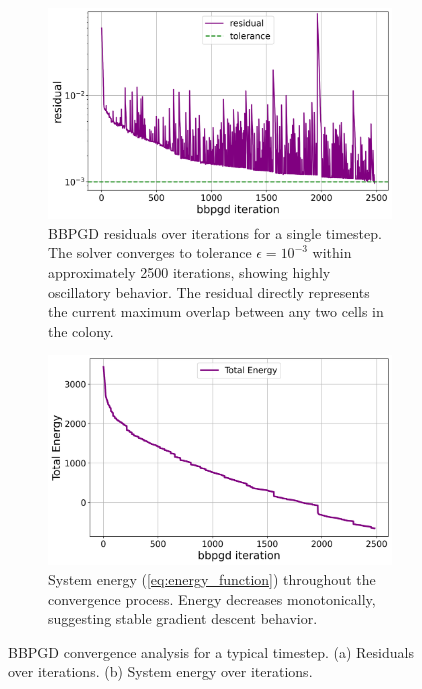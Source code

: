 \documentclass[conference]{IEEEtran}
\begin{document}
\begin{figure}[H]
    \centering
    \begin{subfigure}[b]{\linewidth}
        \centering
        \includegraphics[width=\linewidth]{figures/comparison_plots/bbpgd_residual.png}
        \caption{BBPGD residuals over iterations for a single timestep. The solver converges to tolerance $\epsilon = 10^{-3}$ within approximately 2500 iterations, showing highly oscillatory behavior. The residual directly represents the current maximum overlap between any two cells in the colony.}
        \label{fig:bbpgd_residual}
    \end{subfigure}

    \begin{subfigure}[b]{\linewidth}
        \centering
        \includegraphics[width=\linewidth]{figures/comparison_plots/bbpgd_total_energy.png}
        \caption{System energy (\autoref{eq:energy_function}) throughout the convergence process. Energy decreases monotonically, suggesting stable gradient descent behavior.}
        \label{fig:bbpgd_energy}
    \end{subfigure}

    \caption{BBPGD convergence analysis for a typical timestep. (a) Residuals over iterations. (b) System energy over iterations.}
    \label{fig:bbpgd_analysis}
\end{figure}
\end{document}
